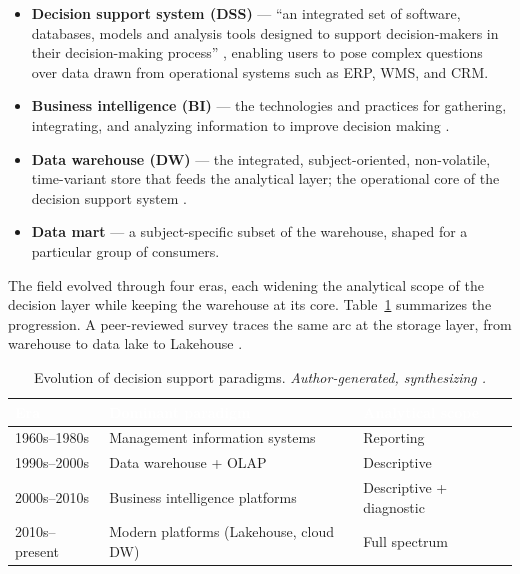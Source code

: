 \begin{itemize}[noitemsep, topsep=4pt]
  \item \textbf{Decision support system (DSS)} --- ``an integrated set of software, databases, models and analysis tools designed to support decision-makers in their decision-making process'' \parencite{abbas2024bi}, enabling users to pose complex questions over data drawn from operational systems such as ERP, WMS, and CRM.
  \item \textbf{Business intelligence (BI)} --- the technologies and practices for gathering, integrating, and analyzing information to improve decision making \parencite{watson2009}.
  \item \textbf{Data warehouse (DW)} --- the integrated, subject-oriented, non-volatile, time-variant store that feeds the analytical layer; the operational core of the decision support system \parencite{inmon2005}.
  \item \textbf{Data mart} --- a subject-specific subset of the warehouse, shaped for a particular group of consumers.
\end{itemize}

\noindent The field evolved through four eras, each widening the analytical scope of the decision layer while keeping the warehouse at its core. Table~\ref{tab:dsis-evolution} summarizes the progression. A peer-reviewed survey traces the same arc at the storage layer, from warehouse to data lake to Lakehouse \parencite{nambiar2022}.

\begin{table}[H]
\centering
\renewcommand{\arraystretch}{1.35}
\caption{Evolution of decision support paradigms. \textit{Author-generated, synthesizing \parencite{chen2012, davenport2007, nambiar2022}.}}
\label{tab:dsis-evolution}
\begin{tabularx}{\linewidth}{|>{\raggedright\arraybackslash}p{3.2cm}|>{\raggedright\arraybackslash}X|>{\raggedright\arraybackslash}X|}
\hline
\rowcolor{tblheader}
\textcolor{white}{\textbf{Era}} &
\textcolor{white}{\textbf{Dominant paradigm}} &
\textcolor{white}{\textbf{Analytical scope}} \\
\hline
1960s--1980s & Management information systems & Reporting \\
1990s--2000s & Data warehouse + OLAP & Descriptive \\
2000s--2010s & Business intelligence platforms & Descriptive + diagnostic \\
2010s--present & Modern platforms (Lakehouse, cloud DW) & Full spectrum \\
\hline
\end{tabularx}
\end{table}


